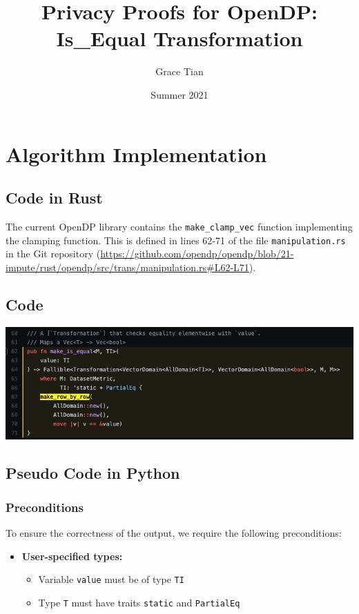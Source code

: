 \documentclass[11pt,a4paper]{article}
\title{Privacy Proofs for OpenDP: Is\_Equal Transformation}
\author{Grace Tian}
\date{Summer 2021}
\begin{document}
\maketitle
\tableofcontents

\section{Algorithm Implementation}
\subsection{Code in Rust}
The current OpenDP library contains the \texttt{make\_clamp\_vec} function implementing the clamping function. This is defined in lines 62-71 of the file \texttt{manipulation.rs} in the Git repository (\url{https://github.com/opendp/opendp/blob/21-impute/rust/opendp/src/trans/manipulation.rs#L62-L71}).

\subsection{Code}


\includegraphics[width=\textwidth]{make_is_equal_new.jpg}


\subsection{Pseudo Code in Python}\label{sec:pseudocode}

\subsubsection*{Preconditions}
To ensure the correctness of the output, we require the following preconditions:

\begin{itemize}
    \item \textbf{User-specified types:}
    \begin{itemize}
        \item Variable \texttt{\texttt{value}} must be of type \texttt{TI}
        \item Type \texttt{T} must have traits \texttt{static} and \texttt{PartialEq}
    \end{itemize}
\end{itemize}
\end{document}
